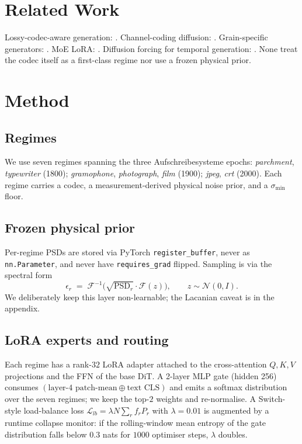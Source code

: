 \documentclass[10pt,a4paper]{article}
\begin{document}
\section{Related Work}\label{sec:related}
Lossy-codec-aware generation: \cite{ddcm2025,fdm2024}. Channel-coding
diffusion: \cite{diffjscc2024}. Grain-specific generators:
\cite{fganrn2025}. MoE LoRA: \cite{loramixer2025}. Diffusion forcing
for temporal generation: \cite{diffusionforcing2024}. None treat the
codec itself as a first-class regime nor use a frozen physical prior.

\section{Method}\label{sec:method}
\subsection{Regimes}
We use seven regimes spanning the three Aufschreibesysteme epochs:
\emph{parchment}, \emph{typewriter} (1800); \emph{gramophone},
\emph{photograph}, \emph{film} (1900); \emph{jpeg}, \emph{crt} (2000).
Each regime carries a codec, a measurement-derived physical noise prior,
and a $\sigma_{\min}$ floor.

\subsection{Frozen physical prior}
Per-regime PSDs are stored via PyTorch \texttt{register\_buffer}, never
as \texttt{nn.Parameter}, and never have \texttt{requires\_grad} flipped.
Sampling is via the spectral form
\[
\epsilon_r \;=\; \mathcal{F}^{-1}\!\bigl(\sqrt{\mathrm{PSD}_r}\cdot
                                       \mathcal{F}(z)\bigr),
\qquad z \sim \mathcal{N}(0, I).
\]
We deliberately keep this layer non-learnable; the Lacanian caveat is in
the appendix.

\subsection{LoRA experts and routing}
Each regime has a rank-$32$ LoRA adapter attached to the cross-attention
$Q,K,V$ projections and the FFN of the base DiT. A 2-layer MLP gate
(hidden 256) consumes
$(\text{layer-4 patch-mean}\oplus\text{text CLS})$ and emits a softmax
distribution over the seven regimes; we keep the top-$2$ weights and
re-normalise. A Switch-style load-balance loss
$\mathcal{L}_{lb} = \lambda N \sum_r f_r P_r$ with $\lambda = 0.01$ is
augmented by a runtime collapse monitor: if the rolling-window mean
entropy of the gate distribution falls below $0.3$ nats for $1000$
optimiser steps, $\lambda$ doubles.
\end{document}

